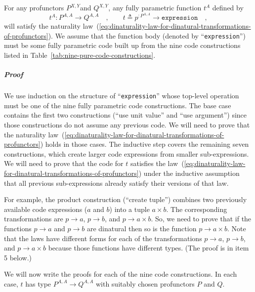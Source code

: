 For any profunctors $P^{X,Y}$and $Q^{X,Y}$, any fully parametric
function $t^{A}$ defined by 
\[
t^{A}:P^{A,A}\rightarrow Q^{A,A}\quad,\quad\quad t\triangleq p^{:P^{A,A}}\rightarrow{\scriptstyle \mathtt{expression}}\quad,
\]
will satisfy the naturality law~(\ref{eq:dinaturality-law-for-dinatural-transformations-of-profunctors}).
We assume that the function body (denoted by \textsf{``}\lstinline!expression!\textsf{''})
must be some fully parametric code built up from the nine code constructions
listed in Table~\ref{tab:nine-pure-code-constructions}.

\subparagraph{Proof }

We use induction on the structure of \textsf{``}\lstinline!expression!\textsf{''}
whose top-level operation must be one of the nine fully parametric
code constructions. The base case contains the first two constructions
(\textsf{``}use unit value\textsf{''} and \textsf{``}use argument\textsf{''}) since those constructions
do not assume any previous code. We will need to prove that the naturality
law~(\ref{eq:dinaturality-law-for-dinatural-transformations-of-profunctors})
holds in those cases. The inductive step covers the remaining seven
constructions, which create larger code expressions from smaller sub-expressions.
We will need to prove that the code for $t$ satisfies the law~(\ref{eq:dinaturality-law-for-dinatural-transformations-of-profunctors})
under the inductive assumption that all previous sub-expressions already
satisfy their versions of that law.

For example, the product construction (\textsf{``}create tuple\textsf{''}) combines
two previously available code expressions ($a$ and $b$) into a tuple
$a\times b$. The corresponding transformations are $p\rightarrow a$,
$p\rightarrow b$, and $p\rightarrow a\times b$. So, we need to prove
that if the functions $p\rightarrow a$ and $p\rightarrow b$ are
dinatural then so is the function $p\rightarrow a\times b$. Note
that the laws have different forms for each of the transformations
$p\rightarrow a$, $p\rightarrow b$, and $p\rightarrow a\times b$
because those functions have different types. (The proof is in item
5 below.)

We will now write the proofs for each of the nine code constructions.
In each case, $t$ has type $P^{A,A}\rightarrow Q^{A,A}$ with suitably
chosen profunctors $P$ and $Q$. %
\begin{comment}
In some cases, we will prove strong dinaturality (from which dinaturality
follows).
\end{comment}


